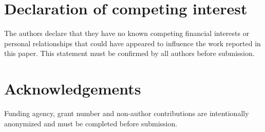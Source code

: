 \documentclass[preprint,12pt]{elsarticle}
\begin{document}
\section*{Declaration of competing interest}
The authors declare that they have no known competing financial interests or personal relationships that could have appeared to influence the work reported in this paper. This statement must be confirmed by all authors before submission.

\section*{Acknowledgements}
Funding agency, grant number and non-author contributions are intentionally anonymized and must be completed before submission.



\end{document}
